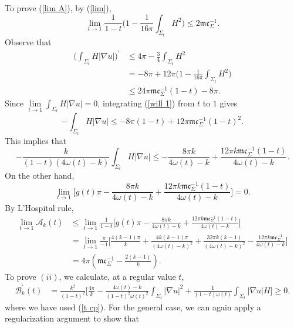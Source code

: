 \documentclass[12pt]{article}
\theoremstyle{definition}
\theoremstyle{plain}
\numberwithin{equation}{section}
\begin{document}
To prove (\ref{lim A}), by (\ref{lim}),
$$
\lim\limits_{t\to 1}\frac{1}{1-t}\Big(1-\frac{1}{16\pi}\int_{\Sigma_{t}}H^{2}\Big)\leq 2\mathfrak{m}\mathfrak{c}_{\Sigma}^{-1}.
$$
Observe that 
\begin{equation}\label{will 1}
\begin{aligned}
\Big(\int_{\Sigma_{t}}H|\nabla u| \Big)^{\prime}&\leq 4\pi-\frac{3}{4}\int_{\Sigma_{t}}H^{2}\\
&=-8\pi+12\pi\Big(1-\frac{1}{16\pi}\int_{\Sigma_{t}}H^{2}\Big)\\
&\leq 24\pi \mathfrak{m}\mathfrak{c}_{\Sigma}^{-1}(1-t)-8\pi.
\end{aligned}
\end{equation}
Since $ \lim\limits_{t\to 1}\int_{\Sigma_{t}}H|\nabla u|=0 $, integrating (\ref{will 1}) from $ t $ to $ 1 $ gives
\begin{equation}\label{will 2}
-\int_{\Sigma_{t}}H|\nabla u|\leq -8\pi(1-t)+12\pi \mathfrak{m}\mathfrak{c}_{\Sigma}^{-1}(1-t)^{2}.
\end{equation}
This implies that 
$$
-\frac{k}{(1-t)(4\omega(t)-k)}\int_{\Sigma_{t}}H|\nabla u|\leq -\frac{8 \pi k}{4\omega(t)-k}+\frac{12\pi k \mathfrak{m}\mathfrak{c}_{\Sigma}^{-1}(1-t)}{4\omega(t)-k}.
$$
On the other hand, 
$$
\lim\limits_{t\to 1}\Big[g(t)\pi-\frac{8 \pi k}{4\omega(t)-k}+\frac{12\pi k \mathfrak{m}\mathfrak{c}_{\Sigma}^{-1}(1-t)}{4\omega(t)-k} \Big]=0.
$$
By L'Hospital rule, 
$$
\begin{aligned}
\lim\limits_{t\to 1}\mathcal{A}_{k}(t)&\leq \lim\limits_{t\to 1}\frac{1}{1-t}\Big[g(t)\pi-\frac{8 \pi k}{4\omega(t)-k}+\frac{12\pi k \mathfrak{m}\mathfrak{c}_{\Sigma}^{-1}(1-t)}{4\omega(t)-k} \Big]\\
&=\lim\limits_{t\to 1}\frac{\pi}{-1}\Big[\frac{4(k-1)\pi}{k}+\frac{4k(k-1)\pi}{(4\omega(t)-k)^{2}}+\frac{32\pi k(k-1)}{(4\omega(t)-k)^{2}}-\frac{12\pi k\mathfrak{m}\mathfrak{c}_{\Sigma}^{-1} }{4\omega(t)-k}\Big]\\
&=4\pi(\mathfrak{m}\mathfrak{c}_{\Sigma}^{-1}-\frac{2(k-1)}{k}).
\end{aligned}
$$
To prove $(ii)$,  we calculate, at a regular value $ t $,
$$
\begin{aligned}
\mathcal{B}_{k}^{\prime}(t)&=\frac{k^{2}}{(1-t)^{2}}\Big[\frac{4\pi}{k}-\frac{4\omega(t)-k}{(1-t)^{2}\omega(t)^{2}}\int_{\Sigma_{t}}|\nabla u|^{2}+\frac{1}{(1-t)\omega(t)}\int_{\Sigma_{t}}|\nabla u|H \Big]\geq0.
\end{aligned}
$$
where we have used (\ref{t cp}).
For the general case, we can again apply a regularization argument to show that 
\end{document}
